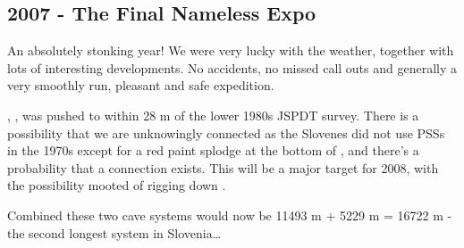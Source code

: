 \begin{tcolorbox}
\chapter{2007 - The Final Nameless Expo}
An absolutely stonking year! We were very lucky with the weather, together with lots of interesting developments. No accidents, no missed call outs and generally a very smoothly run, pleasant and safe expedition.

, , was pushed to within 28 m of the lower  1980s JSPDT survey. There is a possibility that we are unknowingly connected as the Slovenes did not use PSSs in the 1970s except for a red paint splodge at the bottom of , and there's a probability that a connection exists. This will be a major target for 2008, with the possibility mooted of rigging down .

Combined these two cave systems would now be 11493 m + 5229 m = 16722 m - the second longest system in Slovenia\ldots{}

\end{tcolorbox}
\BgThispage
